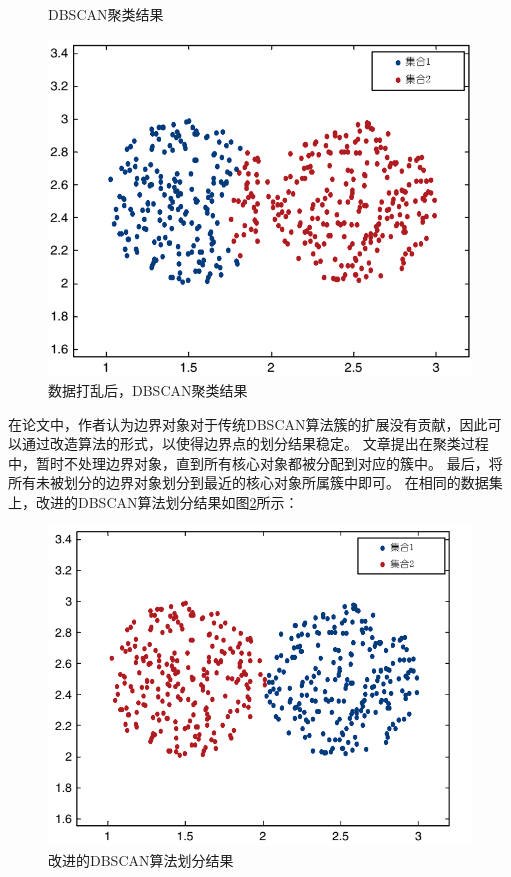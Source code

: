 \begin{figure}[htbp]
\begin{minipage}[t]{0.3\linewidth}
		\caption{DBSCAN聚类结果}
		\label{s4-img-f2}
	\end{minipage}
	\hfill%
	\begin{minipage}[t]{0.3\linewidth}
		\includegraphics[width=\linewidth]{img/expr3.png}
		\caption{数据打乱后，DBSCAN聚类结果}
		\label{s4-img-f3}
	\end{minipage}
\end{figure}

在论文\cite{tran2013revised}中，作者认为边界对象对于传统DBSCAN算法簇的扩展没有贡献，因此可以通过改造算法的形式，以使得边界点的划分结果稳定。
文章提出在聚类过程中，暂时不处理边界对象，直到所有核心对象都被分配到对应的簇中。
最后，将所有未被划分的边界对象划分到最近的核心对象所属簇中即可。
在相同的数据集上，改进的DBSCAN算法划分结果如图\ref{s4-reDBSCANimg}所示：

\begin{figure}[htbp] %
	\centering
	\includegraphics[scale=0.25]{img/expres.png}
	\caption{改进的DBSCAN算法划分结果}
	\label{s4-reDBSCANimg}
\end{figure}

